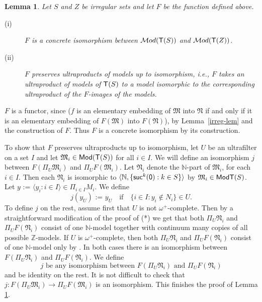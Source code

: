 \documentclass[12pt,leqno]{article}
\newcommand{\de}{\mbox{\ :=\ }}
\newcommand{\Mm}{\mbox{$\mathfrak M$}}
\newcommand{\Nn}{\mbox{$\mathfrak N$}}
\newcommand{\T}{\mbox{\sf T}}
\newcommand{\Mod}{\mbox{\sf Mod}}
\newcommand{\Cat}{\mbox{$\mathcal Mod$}}
\newcommand{\N}{\mathbb N}
\newcommand{\Z}{\mathbb Z}
\newcommand{\zero}{\mbox{\sf 0}}
\newcommand{\suc}{\mbox{\sf suc}}
\newcommand{\qed}{\hfill\mbox{\bf QED}\bigskip}
\newtheorem{lem}{Lemma}
\begin{document}
\begin{lem}\label{functor-lem} Let $S$ and $Z$ be irregular sets and let $F$ be the function defined above.
	\begin{description}
	\item[(i)] $F$ is a concrete isomorphism between $\Cat(\T(S))$ and $\Cat(\T(Z))$.
	\item[(ii)] $F$ preserves ultraproducts of models up to isomorphism, i.e., $F$ takes an ultraproduct of models of $\T(S)$ to a model isomorphic to the corresponding ultraproduct of the $F$-images of the models.	
	\end{description}
\end{lem}

 $F$ is a functor, since ($f$ is an elementary embedding of $\Mm$ into $\Nn$ if and only if it is an elementary embedding of $F(\Mm)$ into $F(\Nn)$),  by Lemma~\ref{irreg-lem} and the construction of $F$. Thus $F$ is a concrete isomorphism by its construction.

To show that $F$ preserves ultraproducts up to isomorphism, let $U$ be an ultrafilter on a set $I$ and let $\Mm_i\in\Mod(\T(S))$ for all $i\in I$. We will define an isomorphism  $j$ between $F(\Pi_U\Mm_i)$ and $\Pi_U F(\Mm_i)$. Let  $\Nn_i$ denote the $\N$-part of $\Mm_i$, for each $i\in I$. Then each $\Nn_i$ is isomorphic to $\langle \N,\{\suc^k(\zero) : k\in S\}\rangle$ by $\Mm_i\in\Mod\T(S)$.  Let $y\de\langle y_i : i\in I\rangle\in\Pi_{i\in I}M_i$. We define
\[ j(y_U) \de y_U\quad\mbox{if}\quad \{ i\in I : y_i\notin N_i\}\in U .\]
To define $j$ on the rest, assume first that $U$ is not $\omega^+$-complete. Then by a straightforward modification of the proof of (*) we get that both $\Pi_U\Nn_i$ and $\Pi_U F(\Nn_i)$ consist of one $\N$-model together with continuum many copies of all possible $\Z$-models. If $U$ is $\omega^+$-complete, then both $\Pi_U\Nn_i$ and $\Pi_U F(\Nn_i)$ consist of one $\N$-model only by \cite[Prop.4.2.4]{CK}. 
In both cases there is an isomorphism between $F(\Pi_U\Nn_i)$ and $\Pi_U F(\Nn_i)$. We define
\[ j\mbox{ be any isomorphism between }F(\Pi_U\Nn_i)\mbox{ and }\Pi_U F(\Nn_i) \]
and be identity on the rest. It is not difficult to check that $j:F(\Pi_U\Mm_i)\to\Pi_U F(\Mm_i)$ is an isomorphism. 
This finishes the proof of Lemma \ref{functor-lem}. %
\bigskip
\end{document}
